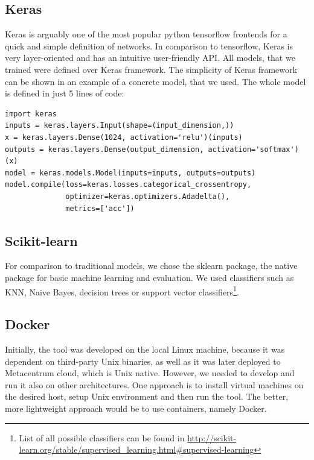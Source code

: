 \subsection{Keras}

Keras\cite{keras} is arguably one of the most popular python tensorflow frontends for a quick and simple definition of networks. In comparison to tensorflow, Keras is very layer-oriented and has an intuitive user-friendly API. All models, that we trained were defined over Keras framework. The simplicity of Keras framework can be shown in an example of a concrete model, that we used. The whole model is defined in just 5 lines of code:

\begin{verbatim}
import keras
inputs = keras.layers.Input(shape=(input_dimension,))
x = keras.layers.Dense(1024, activation='relu')(inputs)
outputs = keras.layers.Dense(output_dimension, activation='softmax')(x)
model = keras.models.Model(inputs=inputs, outputs=outputs)
model.compile(loss=keras.losses.categorical_crossentropy,
              optimizer=keras.optimizers.Adadelta(),
              metrics=['acc'])

\end{verbatim}

\subsection{Scikit-learn}
 
For comparison to traditional models, we chose the sklearn\cite{scikit} package, the native package for basic machine learning and evaluation. We used classifiers such as KNN, Naive Bayes, decision trees or support vector classifiers\footnote{List of all possible classifiers can be found in \url{http://scikit-learn.org/stable/supervised\_learning.html\#supervised-learning}}.  

\subsection{Docker}

\label{docker}

Initially, the tool was developed on the local Linux machine, because it was dependent on third-party Unix binaries, as well as it was later deployed to Metacentrum cloud, which is Unix native. However, we needed to develop and run it also on other architectures. One approach is to install virtual machines on the desired host, setup Unix environment and then run the tool. The better, more lightweight approach would be to use containers, namely Docker\cite{docker}.


